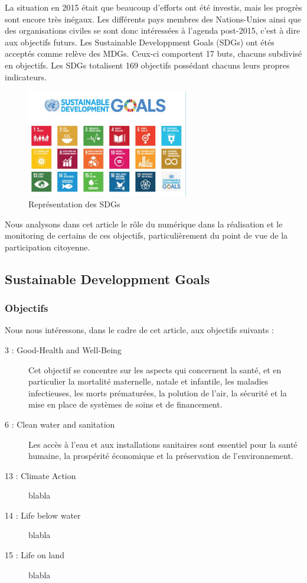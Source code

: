 \documentclass[10pt, conference, compsocconf]{llncs}
\begin{document}
La situation en 2015 était que beaucoup d'efforts ont été investis, mais les progrès sont encore très inégaux. Les différents pays membres des Nations-Unies ainsi que des organisations civiles se sont donc intéressées à l'agenda post-2015, c'est à dire aux objectifs futurs. Les Sustainable Developpment Goals (SDGs) ont étés acceptés comme relève des MDGs. Ceux-ci comportent 17 buts, chacuns subdivisé en objectifs. Les SDGs totalisent 169 objectifs possédant chacuns leurs propres indicateurs.
\begin{figure}
	\begin{center}
		\includegraphics[width=200pt]{sdgs.jpg}
	\end{center}
	\caption{Représentation des SDGs}
\end{figure}

Nous analysons dans cet article le rôle du numérique dans la réalisation et le monitoring de certains de ces objectifs, particulièrement du point de vue de la participation citoyenne.

\subsection{Sustainable Developpment Goals}
\subsubsection{Objectifs}
Nous nous intéressons, dans le cadre de cet article, aux objectifs suivants :
\begin{description}
	\item[ 3 : Good-Health and Well-Being] Cet objectif se concentre sur les aspects qui concernent la santé, et en particulier la mortalité maternelle, natale et infantile, les maladies infectieuses, les morts prématurées, la polution de l'air, la sécurité et la mise en place de systèmes de soins et de financement.
	\item[ 6 : Clean water and sanitation] Les accès à l'eau et aux installations sanitaires sont essentiel pour la santé humaine, la prospérité économique et la préservation de l'environnement.  
	\item[13 : Climate Action] blabla
	\item[14 : Life below water] blabla
	\item[15 : Life on land] blabla
\end{description}
\end{document}

